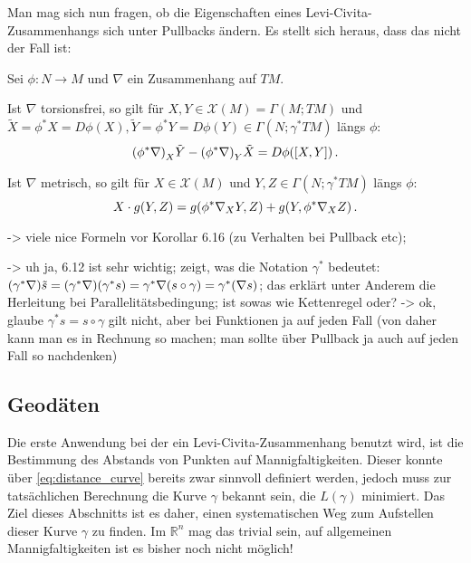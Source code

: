 \documentclass[../H_Analysis_main.tex]{subfiles}
\begin{document}
Man mag sich nun fragen, ob die Eigenschaften eines Levi-Civita-Zusammenhangs sich unter Pullbacks ändern. Es stellt sich heraus, dass das nicht der Fall ist:
\begin{satz}
Sei $\phi: N \rightarrow M$ und $\nabla$ ein Zusammenhang auf $TM$.

Ist $\nabla$ torsionsfrei, so gilt für $X, Y \in \mathcal{X}(M) = \Gamma(M; TM)$ und $\tilde{X} = \phi^* X = D \phi(X), \tilde{Y} = \phi^* Y = D\phi(Y) \in \Gamma(N; \gamma^* TM)$ längs $\phi$:
\begin{equation}
\qty(\phi^* \nabla)_X \tilde{Y} - \qty(\phi^* \nabla)_Y \tilde{X} = D\phi\qty([X, Y]) \, .
\end{equation}

Ist $\nabla$ metrisch, so gilt für $X \in \mathcal{X}(M)$ und $Y, Z \in \Gamma(N; \gamma^* TM)$ längs $\phi$:
\begin{equation}
X \cdot g(Y, Z) = g\qty(\phi^* \nabla_X Y, Z) + g\qty(Y, \phi^* \nabla_X Z) \, .
\end{equation}
\end{satz}






-> viele nice Formeln vor Korollar 6.16 (zu Verhalten bei Pullback etc);


-> uh ja, 6.12 ist sehr wichtig; zeigt, was die Notation $\gamma^*$ bedeutet: $\qty(\gamma^* \nabla) \tilde{s} = \qty(\gamma^* \nabla) \qty(\gamma^* s) =  \gamma^* \nabla \qty(s \circ \gamma) = \gamma^*\qty(\nabla s)$; das erklärt unter Anderem die Herleitung bei Parallelitätsbedingung; ist sowas wie Kettenregel oder? -> ok, glaube $\gamma^* s = s \circ \gamma$ gilt nicht, aber bei Funktionen ja auf jeden Fall (von daher kann man es in Rechnung so machen; man sollte über Pullback ja auch auf jeden Fall so nachdenken)




		\subsection{Geodäten}
Die erste Anwendung bei der ein Levi-Civita-Zusammenhang benutzt wird, ist die Bestimmung des Abstands von Punkten auf Mannigfaltigkeiten. Dieser konnte über \eqref{eq:distance_curve} bereits zwar sinnvoll definiert werden, jedoch muss zur tatsächlichen Berechnung die Kurve $\gamma$ bekannt sein, die $L(\gamma)$ minimiert. Das Ziel dieses Abschnitts ist es daher, einen systematischen Weg zum Aufstellen dieser Kurve $\gamma$ zu finden. Im $\mathbb{R}^n$ mag das trivial sein, auf allgemeinen Mannigfaltigkeiten ist es bisher noch nicht möglich!
\end{document}
